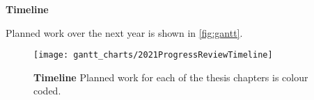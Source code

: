 \documentclass[../main.tex]{subfiles}
\begin{document}
\textbf{Timeline}

Planned work over the next year is shown in \autoref{fig:gantt}.
\begin{sidewaysfigure}[hbt!]
	\begin{center}
		\capstart
		\texttt{[image: gantt\_charts/2021ProgressReviewTimeline]}
		\caption{
			\textbf{Timeline}
			Planned work for each of the thesis chapters is colour coded.            
			\label{fig:gantt}
		}
	\end{center}
\end{sidewaysfigure}
\end{document}
